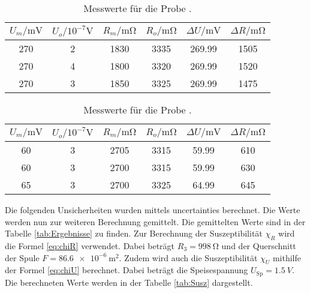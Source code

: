 \begin{table}[H]
    \centering
    \caption{Messwerte für die Probe .}
    \label{tab:Dy}
    \begin{tabular}{c c c c c c}
        \toprule
        $U_m / \unit{\milli\volt}$ & $U_o / 10^{-7}\unit{\volt}$ & $R_m /\unit{\milli\ohm}$ & $R_o /\unit{\milli\ohm}$ & $\Delta U /\unit{\milli\volt}$ & $\Delta R /\unit{\milli\ohm}$ \\
        \midrule        
        270  & 2  & 1830  &  3335 & 269.99  &  1505    \\ 
        270  & 4  & 1800  &  3320 & 269.99  &  1520    \\ 
        270  & 3  & 1850  &  3325 & 269.99  &  1475    \\ 
        \bottomrule
    \end{tabular}
\end{table}

\begin{table}[H]
    \centering
    \caption{Messwerte für die Probe .}
    \label{tab:Gd}
    \begin{tabular}{c c c c c c}
        \toprule
        $U_m /\unit{\milli\volt}$ & $U_o / 10^{-7}\unit{\volt}$ & $R_m /\unit{\milli\ohm}$ & $R_o /\unit{\milli\ohm}$ & $\Delta U /\unit{\milli\volt}$ & $\Delta R /\unit{\milli\ohm}$ \\
        \midrule        
        60  & 3  & 2705  & 3315  & 59.99  & 610     \\ 
        60  & 3  & 2700  & 3315  & 59.99  & 630     \\ 
        65  & 3  & 2700  & 3325  & 64.99  & 645     \\ 
        \bottomrule
    \end{tabular}
\end{table}
\noindent Die folgenden Unsicherheiten wurden mittels uncertainties berechnet.
Die Werte werden nun zur weiteren Berechnung gemittelt.
Die gemittelten Werte sind in der Tabelle \ref{tab:Ergebnisse} zu finden.
Zur Berechnung der Suszeptibilität $\chi_R$ wird die Formel \ref{eq:chiR} verwendet.
Dabei beträgt $R_3 = \SI{998}{\ohm}$ und der Querschnitt der Spule $F=\SI{86.6e-6}{\meter\squared}$.
Zudem wird auch die Suszeptibilität $\chi_U$ mithilfe der Formel \ref{eq:chiU} berechnet.
Dabei beträgt die Speisespannung $U_\text{Sp} = \qty{1.5}{V}$.
Die berechneten Werte werden in der Tabelle \ref{tab:Susz} dargestellt.

